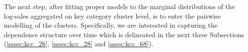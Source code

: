 
The next step, after fitting proper models to the marginal distributions of the log-sales aggregated on key category cluster level, is to enter the pairwise modelling of the clusters. Specifically, we are interested in capturing the dependence structure over time which is delineated in the next three Subsections (\ref{sssec:kcc_26}, \ref{sssec:kcc_28} and \ref{sssec:kcc_68}).
\\


